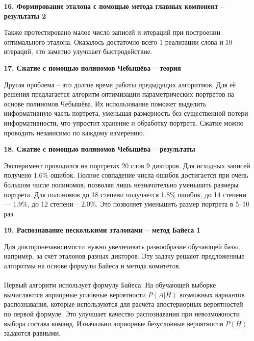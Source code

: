 \documentclass[a4paper, 12pt]{article}
\begin{document}
	
	
	\begin{center}
		\textbf{\large 16. Формирование эталона с помощью метода главных компонент – результаты 2}
	\end{center}	
	\noindent
	Также протестировано малое число записей и итераций при построении оптимального эталона. Оказалось достаточно всего 1 реализации слова и 10 итераций, что заметно улучшает быстродействие.
	
	
	
	\begin{center}
		\textbf{\large 17. Сжатие с помощью полиномов Чебышёва – теория}
	\end{center}	
	\noindent
	Другая проблема – это долгое время работы предыдущих алгоритмов. Для её решения предлагается алгоритм оптимизации параметрических портретов на основе полиномов Чебышёва.
	Их использование поможет выделить информативную часть портрета, уменьшая размерность без существенной потери информативности, что упростит хранение и обработку портрета. Сжатие можно проводить независимо по каждому измерению.
	
	
	
	\begin{center}
		\textbf{\large 18. Сжатие с помощью полиномов Чебышёва – результаты}
	\end{center}	
	\noindent
	Эксперимент проводился на портретах 20 слов 9 дикторов. Для исходных записей получено 1.6\% ошибок. Полное совпадение числа ошибок достигается при очень большом числе полиномов, позволяя лишь незначительно уменьшить размеры портрета. Для полиномов до 18 степени получается 1.8\% ошибок, до 14 степени — 1.9\%, до 12 степени – 2.0\%. Это позволяет уменьшить размер портрета в 5–10 раз.
	
	
	
	\begin{center}
		\textbf{\large 19. Распознавание несколькими эталонами – метод Байеса 1}
	\end{center}	
	\noindent
	Для дикторонезависимости нужно увеличивать разнообразие обучающей базы, например, за счёт эталонов разных дикторов. Эту задачу решают предложенные алгоритмы на основе формулы Байеса и метода комитетов. 
	\\\\
	Первый алгоритм использует формулу Байеса. На обучающей выборке вычисляются априорные условные вероятности $P(A|H)$ возможных вариантов распознавания, которые используются для расчёта апостериорных вероятностей по первой формуле. Это улучшает качество распознавания при невозможности выбора состава команд. Изначально априорные безусловные вероятности $P(H)$ задаются равными.
	
\end{document}
